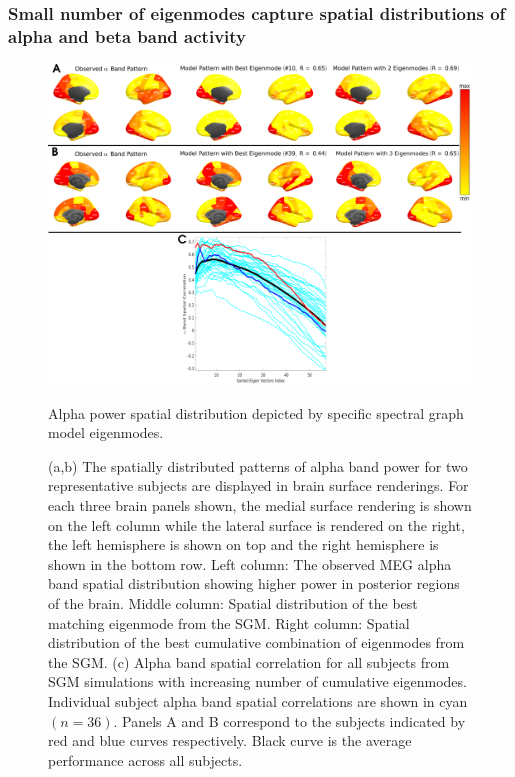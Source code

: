 \subsubsection{Small number of eigenmodes capture spatial distributions of
alpha and beta band activity}

\begin{figure}[htbp]
    \centering
    \includegraphics[width=\textwidth]{../figures/chapter5/fig5_alpha.png}
    \caption{Alpha power spatial distribution depicted by specific spectral graph model eigenmodes.}
    \caption*{(a,b) The spatially distributed patterns of alpha band power for two representative subjects are displayed in brain surface renderings. For each three brain panels shown, the medial surface rendering is shown on the left column while the lateral surface is rendered on the right, the left hemisphere is shown on top and the right hemisphere is shown in the bottom row. Left column: The observed MEG alpha band spatial distribution showing higher power in posterior regions of the brain. Middle column: Spatial distribution of the best matching eigenmode from the SGM. Right column: Spatial distribution of the best cumulative combination of eigenmodes from the SGM. (c) Alpha band spatial correlation for all subjects from SGM simulations with increasing number of cumulative eigenmodes. Individual subject alpha band spatial correlations are shown in cyan $(n=36)$. Panels A and B correspond to the subjects indicated by red and blue curves respectively. Black curve is the average performance across all subjects.}
    \label{fig:alpha}
\end{figure}

